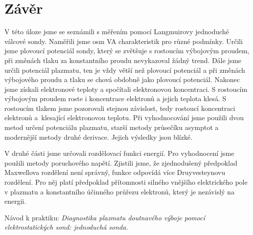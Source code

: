 \documentclass[a4paper,12pt]{article}
\begin{document}
\clearpage
\section{Závěr}
V této úloze jsme se seznámili s měřením pomocí Langmuirovy jednoduché válcové sondy. Naměřili jsme osm VA charakteristik pro různé
podmínky. Určili jsme plovoucí potenciál sondy, který se zvětšuje s rostoucím výbojovým proudem, při změnách tlaku za konstantního
proudu nevykazoval žádný trend. Dále jsme určili potenciál plazmatu, ten je vždy větší než plovoucí potenciál a při změnách výbojového
proudu a tlaku se chová obdobně jako plovoucí potenciál. Nakonec jsme získali elektronové teploty a spočítali elektronovou koncentraci. S rostoucím výbojovým
proudem roste i koncentrace elektronů a jejich teplota klesá. S rostoucím tlakem jsme pozorovali stejnou závislost, tedy rostoucí
koncentraci elektronů a~klesající elektronovou teplotu. Při vyhodnocování jsme 
použili dvou metod určení potenciálu plazmatu, starší metody průsečíku asymptot 
a modernější metody druhé derivace. Jejich výsledky jsou blízké.

V druhé části jsme určovali rozdělovací funkci energií. Pro vyhodnocení jsme 
použili metody poruchového napětí. Zjistili jsme, že zjednodušený předpoklad 
Maxwellova rozdělení není správný, funkce odpovídá více Druyvesteynovu rozdělení. 
Pro něj platí předpoklad přítomnosti silného vnějšího elektrického pole v plazmatu
a konstantního účinného průřezu elektronů, který je nezávislý na energii.

\begin{thebibliography}{10}
	 Návod k praktiku: \textit{Diagnostika plazmatu doutnavého výboje pomocí 
	elektrostatických sond: jednoduchá sonda.}

\end{thebibliography}
\end{document}
